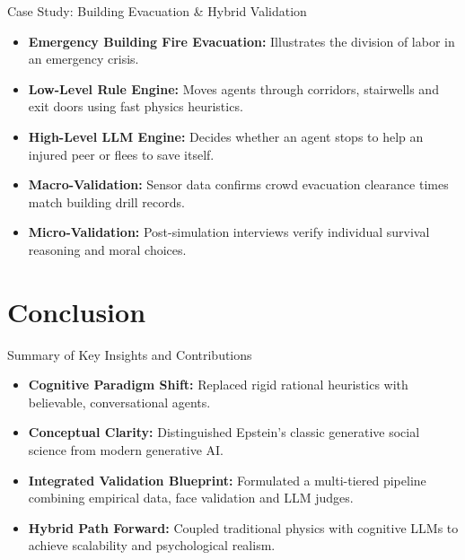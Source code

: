 \documentclass{beamer}
\begin{document}
\begin{frame}{Case Study: Building Evacuation \& Hybrid Validation}
\begin{itemize}
    \item \textbf{Emergency Building Fire Evacuation:} Illustrates the division of labor in an emergency crisis.
    \medskip
    \item \textbf{Low-Level Rule Engine:} Moves agents through corridors, stairwells and exit doors using fast physics heuristics.
    \medskip
    \item \textbf{High-Level LLM Engine:} Decides whether an agent stops to help an injured peer or flees to save itself.
    \medskip
    \item \textbf{Macro-Validation:} Sensor data confirms crowd evacuation clearance times match building drill records.
    \medskip
    \item \textbf{Micro-Validation:} Post-simulation interviews verify individual survival reasoning and moral choices.
\end{itemize}
\end{frame}

\section{Conclusion}

\begin{frame}{Summary of Key Insights and Contributions}
\begin{itemize}
    \item \textbf{Cognitive Paradigm Shift:} Replaced rigid rational heuristics with believable, conversational agents.
    \medskip
    \item \textbf{Conceptual Clarity:} Distinguished Epstein's classic generative social science from modern generative AI.
    \medskip
    \item \textbf{Integrated Validation Blueprint:} Formulated a multi-tiered pipeline combining empirical data, face validation and LLM judges.
    \medskip
    \item \textbf{Hybrid Path Forward:} Coupled traditional physics with cognitive LLMs to achieve scalability and psychological realism.
\end{itemize}
\end{frame}
\end{document}
